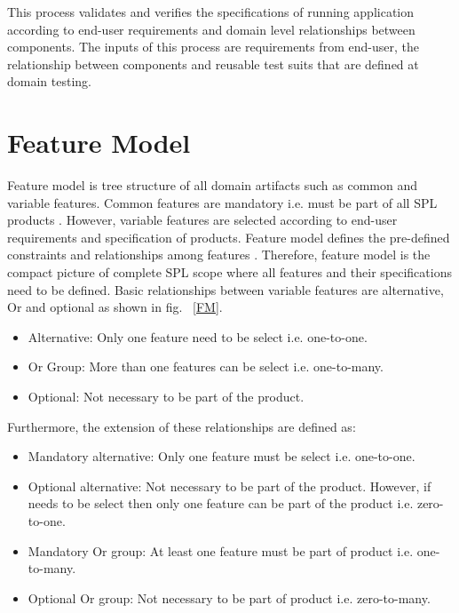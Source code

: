This process validates and verifies the specifications of running application according to end-user requirements and domain level relationships between components. The inputs of this process are requirements from end-user, the relationship between components and reusable test suits that are defined at domain testing. 

\section{Feature Model}
Feature model is tree structure of all domain artifacts such as common and variable features. Common features are mandatory i.e. must be part of all SPL products \cite{t67, t68}. However, variable features are selected according to end-user requirements and specification of products. Feature model defines the pre-defined constraints and relationships among features \cite{t69}. Therefore, feature model is the compact picture of complete SPL scope where all features and their specifications need to be defined. Basic relationships between variable features are alternative, Or and optional \cite{t70, t71} as shown in fig. ~\ref{FM}.


\begin{itemize}
	\item Alternative: Only one feature need to be select i.e. one-to-one.
	\item Or Group: More than one features can be select i.e. one-to-many.
	\item Optional: Not necessary to be part of the product.
\end{itemize}

Furthermore, the extension of these relationships are defined as:

\begin{itemize}
	\item Mandatory alternative: Only one feature must be select i.e. one-to-one.
	\item Optional alternative: Not necessary to be part of the product. However, if needs to be select then only one feature can be part of the product i.e. zero-to-one. 
	\item Mandatory Or group: At least one feature must be part of product i.e. one-to-many.
	\item Optional Or group: Not necessary to be part of product i.e. zero-to-many.  
\end{itemize}

